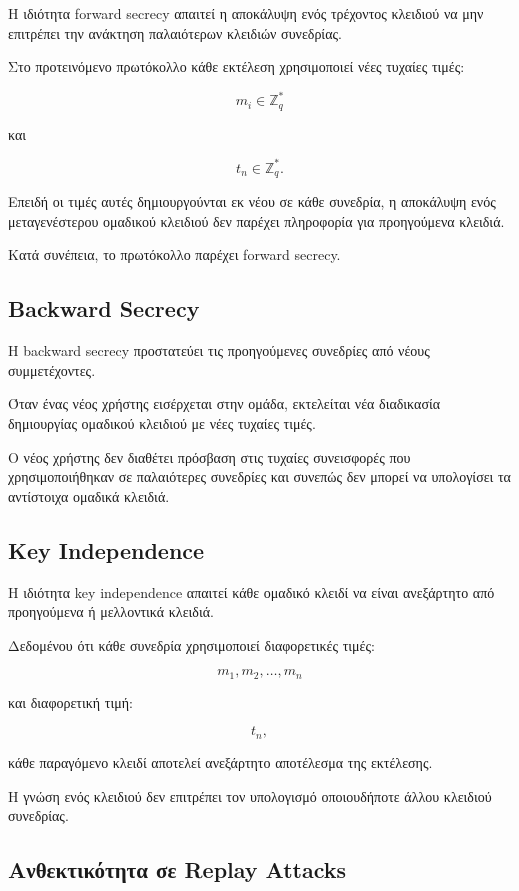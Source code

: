 \documentclass[12pt,a4paper]{report}
\begin{document}
Η ιδιότητα forward secrecy απαιτεί η αποκάλυψη ενός τρέχοντος κλειδιού να μην επιτρέπει την ανάκτηση παλαιότερων κλειδιών συνεδρίας.

Στο προτεινόμενο πρωτόκολλο κάθε εκτέλεση χρησιμοποιεί νέες τυχαίες τιμές:

\[
m_i \in \mathbb{Z}_q^{*}
\]

και

\[
t_n \in \mathbb{Z}_q^{*}.
\]

Επειδή οι τιμές αυτές δημιουργούνται εκ νέου σε κάθε συνεδρία, η αποκάλυψη ενός μεταγενέστερου ομαδικού κλειδιού δεν παρέχει πληροφορία για προηγούμενα κλειδιά.

Κατά συνέπεια, το πρωτόκολλο παρέχει forward secrecy.

\subsection{Backward Secrecy}

Η backward secrecy προστατεύει τις προηγούμενες συνεδρίες από νέους συμμετέχοντες.

Όταν ένας νέος χρήστης εισέρχεται στην ομάδα, εκτελείται νέα διαδικασία δημιουργίας ομαδικού κλειδιού με νέες τυχαίες τιμές.

Ο νέος χρήστης δεν διαθέτει πρόσβαση στις τυχαίες συνεισφορές που χρησιμοποιήθηκαν σε παλαιότερες συνεδρίες και συνεπώς δεν μπορεί να υπολογίσει τα αντίστοιχα ομαδικά κλειδιά.

\subsection{Key Independence}

Η ιδιότητα key independence απαιτεί κάθε ομαδικό κλειδί να είναι ανεξάρτητο από προηγούμενα ή μελλοντικά κλειδιά.

Δεδομένου ότι κάθε συνεδρία χρησιμοποιεί διαφορετικές τιμές:

\[
m_1,m_2,\ldots,m_n
\]

και διαφορετική τιμή:

\[
t_n,
\]

κάθε παραγόμενο κλειδί αποτελεί ανεξάρτητο αποτέλεσμα της εκτέλεσης.

Η γνώση ενός κλειδιού δεν επιτρέπει τον υπολογισμό οποιουδήποτε άλλου κλειδιού συνεδρίας.

\subsection{Ανθεκτικότητα σε Replay Attacks}
\end{document}

